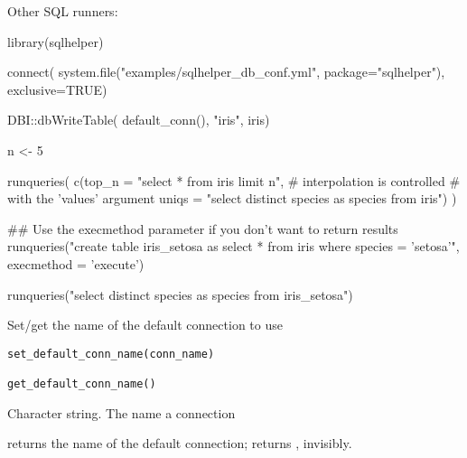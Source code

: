 \documentclass[a4paper]{book}
\begin{document}
%
\begin{SeeAlso}\relax
{}

Other SQL runners: 
\end{SeeAlso}
%
\begin{Examples}
\begin{ExampleCode}
{
library(sqlhelper)

connect(
    system.file("examples/sqlhelper_db_conf.yml", package="sqlhelper"),
    exclusive=TRUE)

DBI::dbWriteTable( default_conn(),
                  "iris",
                  iris)

n <- 5

runqueries(
    c(top_n = "select * from iris limit {n}", # interpolation is controlled
                                              # with the 'values' argument
      uniqs = "select distinct species as species from iris")
)

## Use the execmethod parameter if you don't want to return results
runqueries("create table iris_setosa as select * from iris where species = 'setosa'",
          execmethod = 'execute')

runqueries("select distinct species as species from iris_setosa")
}
\end{ExampleCode}
\end{Examples}
%
\begin{Description}\relax
Set/get the name of the default connection to use
\end{Description}
%
\begin{Usage}
\begin{verbatim}
set_default_conn_name(conn_name)

get_default_conn_name()
\end{verbatim}
\end{Usage}
%
\begin{Arguments}
\begin{ldescription}
\item[\code{conn\_name}] Character string. The name a connection
\end{ldescription}
\end{Arguments}
%
\begin{Value}
 returns the name of the default connection; 
returns , invisibly.
\end{Value}
\printindex{}
\end{document}
